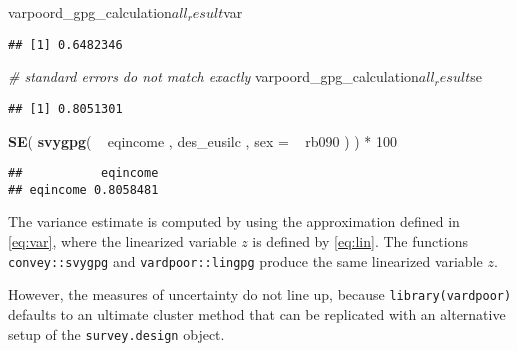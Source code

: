 \documentclass[]{book}
\newenvironment{Shaded}{\begin{snugshade}}{\end{snugshade}}
\newcommand{\KeywordTok}[1]{\textcolor[rgb]{0.13,0.29,0.53}{\textbf{{#1}}}}
\newcommand{\DataTypeTok}[1]{\textcolor[rgb]{0.13,0.29,0.53}{{#1}}}
\newcommand{\DecValTok}[1]{\textcolor[rgb]{0.00,0.00,0.81}{{#1}}}
\newcommand{\StringTok}[1]{\textcolor[rgb]{0.31,0.60,0.02}{{#1}}}
\newcommand{\CommentTok}[1]{\textcolor[rgb]{0.56,0.35,0.01}{\textit{{#1}}}}
\newcommand{\NormalTok}[1]{{#1}}
\theoremstyle{definition}
\theoremstyle{definition}
\theoremstyle{remark}
\begin{document}
\begin{Shaded}
\begin{Highlighting}[]
\NormalTok{varpoord_gpg_calculation$all_result$var}
\end{Highlighting}
\end{Shaded}

\begin{verbatim}
## [1] 0.6482346
\end{verbatim}

\begin{Shaded}
\begin{Highlighting}[]
\CommentTok{# standard errors do not match exactly}
\NormalTok{varpoord_gpg_calculation$all_result$se}
\end{Highlighting}
\end{Shaded}

\begin{verbatim}
## [1] 0.8051301
\end{verbatim}

\begin{Shaded}
\begin{Highlighting}[]
\KeywordTok{SE}\NormalTok{( }\KeywordTok{svygpg}\NormalTok{( ~}\StringTok{ }\NormalTok{eqincome , des_eusilc , }\DataTypeTok{sex =} \NormalTok{~}\StringTok{ }\NormalTok{rb090 ) ) *}\StringTok{ }\DecValTok{100}
\end{Highlighting}
\end{Shaded}

\begin{verbatim}
##           eqincome
## eqincome 0.8058481
\end{verbatim}

The variance estimate is computed by using the approximation defined in
\eqref{eq:var}, where the linearized variable \(z\) is defined by
\eqref{eq:lin}. The functions \texttt{convey::svygpg} and
\texttt{vardpoor::lingpg} produce the same linearized variable \(z\).

However, the measures of uncertainty do not line up, because
\texttt{library(vardpoor)} defaults to an ultimate cluster method that
can be replicated with an alternative setup of the
\texttt{survey.design} object.
\end{document}
